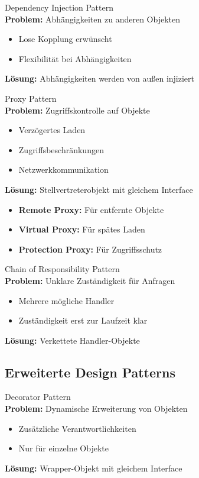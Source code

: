 \begin{definition}{Dependency Injection Pattern}\\
\textbf{Problem:} Abhängigkeiten zu anderen Objekten
\begin{itemize}
    \item Lose Kopplung erwünscht
    \item Flexibilität bei Abhängigkeiten
\end{itemize}
\textbf{Lösung:} Abhängigkeiten werden von außen injiziert
\end{definition}

\begin{definition}{Proxy Pattern}\\
\textbf{Problem:} Zugriffskontrolle auf Objekte
\begin{itemize}
    \item Verzögertes Laden
    \item Zugriffsbeschränkungen
    \item Netzwerkkommunikation
\end{itemize}
\textbf{Lösung:} Stellvertreterobjekt mit gleichem Interface
\begin{itemize}
    \item \textbf{Remote Proxy:} Für entfernte Objekte
    \item \textbf{Virtual Proxy:} Für spätes Laden
    \item \textbf{Protection Proxy:} Für Zugriffsschutz
\end{itemize}
\end{definition}

\begin{definition}{Chain of Responsibility Pattern}\\
\textbf{Problem:} Unklare Zuständigkeit für Anfragen
\begin{itemize}
    \item Mehrere mögliche Handler
    \item Zuständigkeit erst zur Laufzeit klar
\end{itemize}
\textbf{Lösung:} Verkettete Handler-Objekte
\end{definition}

\columnbreak

\subsection{Erweiterte Design Patterns}

\begin{definition}{Decorator Pattern}\\
\textbf{Problem:} Dynamische Erweiterung von Objekten
\begin{itemize}
    \item Zusätzliche Verantwortlichkeiten
    \item Nur für einzelne Objekte
\end{itemize}
\textbf{Lösung:} Wrapper-Objekt mit gleichem Interface
\end{definition}

